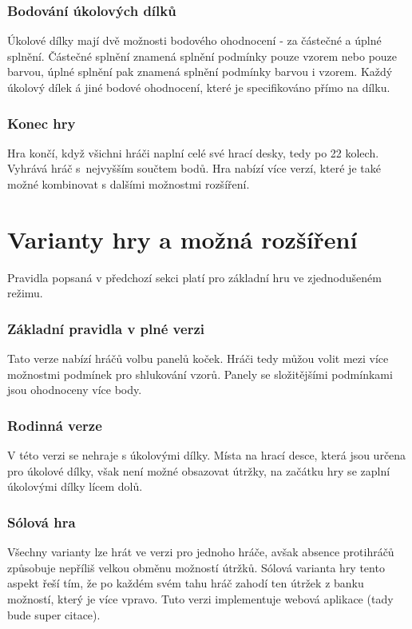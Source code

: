 \subsubsection*{Bodování úkolových dílků}
Úkolové dílky mají dvě možnosti bodového ohodnocení - za částečné a úplné splnění. Částečné splnění znamená splnění podmínky pouze vzorem nebo pouze barvou, úplné splnění pak znamená splnění podmínky barvou i vzorem. Každý úkolový dílek á jiné bodové ohodnocení, které je specifikováno přímo na dílku.


\subsubsection*{Konec hry}

Hra končí, když všichni hráči naplní celé své hrací desky, tedy po 22 kolech. Vyhrává hráč s~nejvyšším součtem bodů. Hra nabízí více verzí, které je také možné kombinovat s dalšími možnostmi rozšíření.


\section{Varianty hry a možná rozšíření}

Pravidla popsaná v předchozí sekci platí pro základní hru ve zjednodušeném režimu.

\subsubsection*{Základní pravidla v plné verzi}
Tato verze nabízí hráčů volbu panelů koček. Hráči tedy můžou volit mezi více možnostmi podmínek pro shlukování vzorů. Panely se složitějšími podmínkami jsou ohodnoceny více body.

\subsubsection*{Rodinná verze}
V této verzi se nehraje s úkolovými dílky. Místa na hrací desce, která jsou určena pro úkolové dílky, však není možné obsazovat útržky, na začátku hry se zaplní úkolovými dílky lícem dolů.

\subsubsection*{Sólová hra}
Všechny varianty lze hrát ve verzi pro jednoho hráče, avšak absence protihráčů způsobuje nepříliš velkou obměnu možností útržků. Sólová varianta hry tento aspekt řeší tím, že po každém svém tahu hráč zahodí ten útržek z banku možností, který je více vpravo. Tuto verzi implementuje webová aplikace (tady bude super citace).

